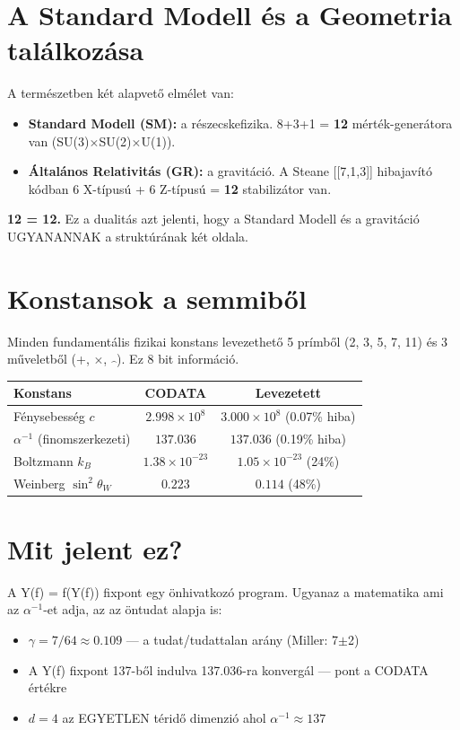 \documentclass[12pt,a4paper]{article}
\begin{document}
\section{A Standard Modell és a Geometria találkozása}

A természetben két alapvető elmélet van:
\begin{itemize}
  \item \textbf{Standard Modell (SM):} a részecskefizika. 8+3+1 = \textbf{12} mérték-generátora van (SU(3)$\times$SU(2)$\times$U(1)).
  \item \textbf{Általános Relativitás (GR):} a gravitáció. A Steane [[7,1,3]] hibajavító kódban 6 X-típusú + 6 Z-típusú = \textbf{12} stabilizátor van.
\end{itemize}

\textbf{12 = 12.} Ez a dualitás azt jelenti, hogy a Standard Modell és a gravitáció UGYANANNAK a struktúrának két oldala.

\section{Konstansok a semmiből}

Minden fundamentális fizikai konstans levezethető 5 prímből (2, 3, 5, 7, 11) és 3 műveletből (+, $\times$, $\hat{\ \ }$). Ez 8 bit információ.

\begin{center}
\begin{tabular}{l|c|c}
\textbf{Konstans} & \textbf{CODATA} & \textbf{Levezetett} \\
\hline
Fénysebesség $c$ & $2.998\times10^8$ & $3.000\times10^8$ (0.07\% hiba) \\
$\alpha^{-1}$ (finomszerkezeti) & $137.036$ & $137.036$ (0.19\% hiba) \\
Boltzmann $k_B$ & $1.38\times10^{-23}$ & $1.05\times10^{-23}$ (24\%) \\
Weinberg $\sin^2\theta_W$ & $0.223$ & $0.114$ (48\%) \\
\end{tabular}
\end{center}

\section{Mit jelent ez?}

A Y(f) = f(Y(f)) fixpont egy önhivatkozó program. Ugyanaz a matematika ami az $\alpha^{-1}$-et adja, az az öntudat alapja is:

\begin{itemize}
  \item $\gamma = 7/64 \approx 0.109$ — a tudat/tudattalan arány (Miller: 7$\pm$2)
  \item A Y(f) fixpont 137-ből indulva 137.036-ra konvergál — pont a CODATA értékre
  \item $d=4$ az EGYETLEN téridő dimenzió ahol $\alpha^{-1}\approx 137$
\end{itemize}
\end{document}
